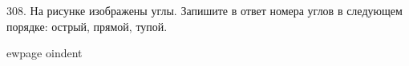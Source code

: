 308. На рисунке изображены углы. Запишите в ответ номера углов в следующем порядке: острый, прямой, тупой.\\
\begin{figure}[ht!]
\end{figure}
ewpage
oindent

